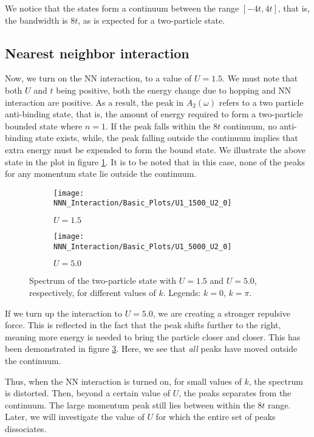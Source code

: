 \documentclass[a4paper, 11pt]{report}
\begin{document}
We notice that the states form a continuum between the range $\left[-4t, 4t\right]$, that is, the bandwidth is $8t$, as is expected for a two-particle state.

\subsection{Nearest neighbor interaction}
Now, we turn on the NN interaction, to a value of $U = 1.5$. We must note that both $U$ and $t$ being positive, both the energy change due to hopping and NN interaction are positive. As a result, the peak in $A^{}_{2}\left(\omega\right)$ refers to a two particle anti-binding state, that is, the amount of energy required to form a two-particle bounded state where $n=1$. If the peak falls within the $8t$ continuum, no anti-binding state exists, while, the peak falling outside the continuum implies that extra energy must be expended to form the bound state. We illustrate the above state in the plot in figure \ref{fig:u11500u20}. It is to be noted that in this case, none of the peaks for any momentum state lie outside the continuum.

\begin{figure}[h!]
\centering
\begin{subfigure}{0.45\linewidth}
	\texttt{[image: NNN\_Interaction/Basic\_Plots/U1\_1500\_U2\_0]}
	\caption{$U = 1.5$}
	\label{fig:u11500u20}
\end{subfigure}
\begin{subfigure}{0.45\linewidth}
\texttt{[image: NNN\_Interaction/Basic\_Plots/U1\_5000\_U2\_0]}
\caption{$U = 5.0$}
\label{fig:u15000u20}
\end{subfigure}
\caption{Spectrum of the two-particle state with $U = 1.5$ and $U = 5.0$, respectively, for different values of $k$. Legends: {\color{blue} $k = 0$}, {\color{red} $k = \pi$}.}
\end{figure}

If we turn up the interaction to $U = 5.0$, we are creating a stronger repulsive force. This is reflected in the fact that the peak shifts further to the right, meaning more energy is needed to bring the particle closer and closer. This has been demonstrated in figure \ref{fig:u15000u20}. Here, we see that \textit{all} peaks have moved outside the continuum.

Thus, when the NN interaction is turned on, for small values of $k$, the spectrum is distorted. Then, beyond a certain value of $U$, the peaks separates from the continuum. The large momentum peak still lies between within the $8t$ range. Later, we will investigate the value of $U$ for which the entire set of peaks dissociates.
\end{document}
